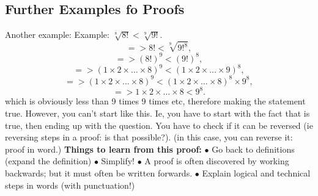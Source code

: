 \documentclass{article}
\begin{document}
\subsection{Further Examples fo Proofs}
Another example: 
\newline
Example: $\sqrt[8]{8!} < \sqrt[9]{9!}$.
$$=> 8! < \sqrt[9]{9! ^ 8},$$
$$=> (8!)^ 9 < (9!)^ 8, $$
$$=> (1 \times 2 \times \dots \times 8)^9 < (1 \times 2 \times \dots \times 9)^8, $$
$$=> (1 \times 2 \times \dots \times 8)^9 < (1 \times 2 \times \dots \times 8)^8 \times 9^8,$$
$$=> 1 \times 2 \times \dots \times 8 < 9^8.$$
which is obviously less than 9 times 9 times etc, therefore making the statement true.
\newline
\newline
However, you can't start like this. Ie, you have to start with the fact that is true, then ending up with the question.
\newline
You have to check if it can be reversed (ie reversing steps in a proof: is that possible?).
\newline
(in this case, you can reverse it: proof in word.)
\newline
\newline
\textbf{ Things to learn from this proof:}
\newline
\newline
$\bullet$ Go back to definitions (expand the definition)
\newline
$\bullet$ Simplify!
\newline
$\bullet$ A proof is often discovered by working backwards; but it must often be written forwards.
\newline
$\bullet$ Explain logical and technical steps in words (with punctuation!)
\newpage
\end{document}
